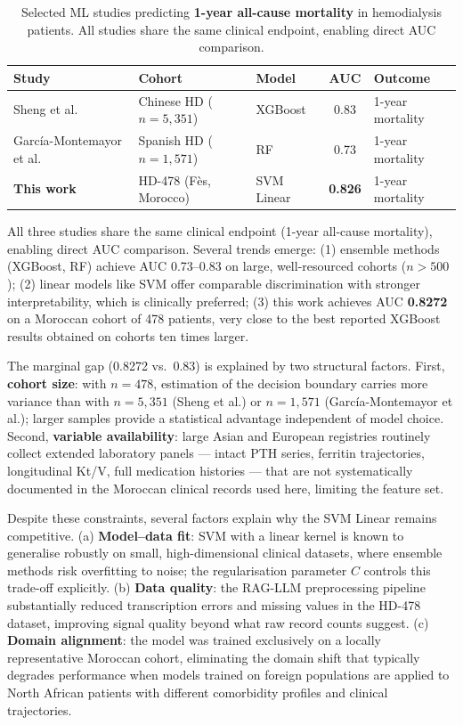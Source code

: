 \documentclass[12pt,a4paper,twoside]{report}
\begin{document}
\begin{table}[htbp]
\centering
\caption{Selected ML studies predicting \textbf{1-year all-cause mortality} in hemodialysis patients. All studies share the same clinical endpoint, enabling direct AUC comparison.}
\label{tab:lit_review}
\begin{tabularx}{\textwidth}{p{4cm}Xp{2.5cm}cp{2.5cm}}
\toprule
\textbf{Study} & \textbf{Cohort} & \textbf{Model} & \textbf{AUC} & \textbf{Outcome} \\
\midrule
Sheng et al. \cite{sheng2020} & Chinese HD ($n=5{,}351$) & XGBoost & 0.83 & 1-year mortality \\
Garc\'ia-Montemayor et al. \cite{garcia2021} & Spanish HD ($n=1{,}571$) & RF & 0.73 & 1-year mortality \\
\textbf{This work} & HD-478 (Fès, Morocco) & SVM Linear & \textbf{0.826} & 1-year mortality \\
\bottomrule
\end{tabularx}
\end{table}

All three studies share the same clinical endpoint (1-year all-cause mortality), enabling direct AUC comparison. Several trends emerge: (1) ensemble methods (XGBoost, RF) achieve AUC 0.73--0.83 on large, well-resourced cohorts ($n > 500$); (2) linear models like SVM offer comparable discrimination with stronger interpretability, which is clinically preferred; (3) this work achieves AUC \textbf{0.8272} on a Moroccan cohort of 478 patients, very close to the best reported XGBoost results obtained on cohorts ten times larger.

The marginal gap (0.8272 vs.\ 0.83) is explained by two structural factors. First, \textbf{cohort size}: with $n = 478$, estimation of the decision boundary carries more variance than with $n = 5{,}351$ (Sheng et al.) or $n = 1{,}571$ (Garc\'ia-Montemayor et al.); larger samples provide a statistical advantage independent of model choice. Second, \textbf{variable availability}: large Asian and European registries routinely collect extended laboratory panels — intact PTH series, ferritin trajectories, longitudinal Kt/V, full medication histories — that are not systematically documented in the Moroccan clinical records used here, limiting the feature set.

Despite these constraints, several factors explain why the SVM Linear remains competitive. (a) \textbf{Model--data fit}: SVM with a linear kernel is known to generalise robustly on small, high-dimensional clinical datasets, where ensemble methods risk overfitting to noise; the regularisation parameter $C$ controls this trade-off explicitly. (b) \textbf{Data quality}: the RAG-LLM preprocessing pipeline substantially reduced transcription errors and missing values in the HD-478 dataset, improving signal quality beyond what raw record counts suggest. (c) \textbf{Domain alignment}: the model was trained exclusively on a locally representative Moroccan cohort, eliminating the domain shift that typically degrades performance when models trained on foreign populations are applied to North African patients with different comorbidity profiles and clinical trajectories.
\end{document}
